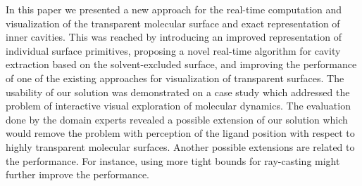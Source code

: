 In this paper we presented a new approach for the real-time computation and visualization of the transparent molecular surface and exact representation of inner cavities. 
This was reached by introducing an improved representation of individual surface primitives, proposing a novel real-time algorithm for cavity extraction based on the solvent-excluded surface, and improving the performance of one of the existing approaches for visualization of transparent surfaces.
The usability of our solution was demonstrated on a case study which addressed the problem of interactive visual exploration of molecular dynamics.
The evaluation done by the domain experts revealed a possible extension of our solution which would remove the problem with perception of the ligand position with respect to highly transparent molecular surfaces.
Another possible extensions are related to the performance. 
For instance, using more tight bounds for ray-casting might further improve the performance.
